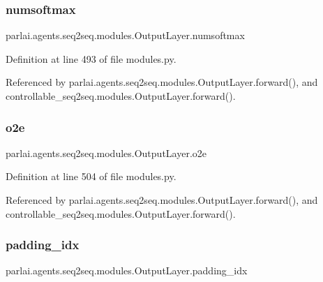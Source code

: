 \subsubsection{\texorpdfstring{numsoftmax}{numsoftmax}}
{\footnotesize\ttfamily parlai.\+agents.\+seq2seq.\+modules.\+Output\+Layer.\+numsoftmax}



Definition at line 493 of file modules.\+py.



Referenced by parlai.\+agents.\+seq2seq.\+modules.\+Output\+Layer.\+forward(), and controllable\+\_\+seq2seq.\+modules.\+Output\+Layer.\+forward().

\mbox{\label{classparlai_1_1agents_1_1seq2seq_1_1modules_1_1OutputLayer_a0d76edf5fb553c45e025103b154b34a1}} 
\subsubsection{\texorpdfstring{o2e}{o2e}}
{\footnotesize\ttfamily parlai.\+agents.\+seq2seq.\+modules.\+Output\+Layer.\+o2e}



Definition at line 504 of file modules.\+py.



Referenced by parlai.\+agents.\+seq2seq.\+modules.\+Output\+Layer.\+forward(), and controllable\+\_\+seq2seq.\+modules.\+Output\+Layer.\+forward().

\mbox{\label{classparlai_1_1agents_1_1seq2seq_1_1modules_1_1OutputLayer_acc82ef26b2a162662c729fc325d39b54}} 
\subsubsection{\texorpdfstring{padding\+\_\+idx}{padding\_idx}}
{\footnotesize\ttfamily parlai.\+agents.\+seq2seq.\+modules.\+Output\+Layer.\+padding\+\_\+idx}



